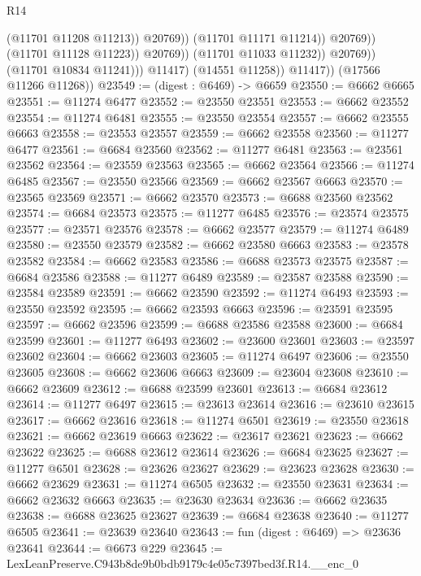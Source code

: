 \begin{lexlean}{R14}
\begin{coremodule}
                                          (@11701 @11208 @11213))
                                        @20769))
                                    (@11701 @11171 @11214))
                                  @20769))
                              (@11701 @11128 @11223))
                            @20769))
                        (@11701 @11033 @11232))
                      @20769))
                  (@11701 @10834 @11241)))
              @11417)
            (@14551 @11258))
          @11417))
      (@17566 @11266 @11268))
@23549 := (digest : @6469) -> @6659
@23550 := @6662 @6665
@23551 := @11274 @6477
@23552 := @23550 @23551
@23553 := @6662 @23552
@23554 := @11274 @6481
@23555 := @23550 @23554
@23557 := @6662 @23555 @6663
@23558 := @23553 @23557
@23559 := @6662 @23558
@23560 := @11277 @6477
@23561 := @6684 @23560
@23562 := @11277 @6481
@23563 := @23561 @23562
@23564 := @23559 @23563
@23565 := @6662 @23564
@23566 := @11274 @6485
@23567 := @23550 @23566
@23569 := @6662 @23567 @6663
@23570 := @23565 @23569
@23571 := @6662 @23570
@23573 := @6688 @23560 @23562
@23574 := @6684 @23573
@23575 := @11277 @6485
@23576 := @23574 @23575
@23577 := @23571 @23576
@23578 := @6662 @23577
@23579 := @11274 @6489
@23580 := @23550 @23579
@23582 := @6662 @23580 @6663
@23583 := @23578 @23582
@23584 := @6662 @23583
@23586 := @6688 @23573 @23575
@23587 := @6684 @23586
@23588 := @11277 @6489
@23589 := @23587 @23588
@23590 := @23584 @23589
@23591 := @6662 @23590
@23592 := @11274 @6493
@23593 := @23550 @23592
@23595 := @6662 @23593 @6663
@23596 := @23591 @23595
@23597 := @6662 @23596
@23599 := @6688 @23586 @23588
@23600 := @6684 @23599
@23601 := @11277 @6493
@23602 := @23600 @23601
@23603 := @23597 @23602
@23604 := @6662 @23603
@23605 := @11274 @6497
@23606 := @23550 @23605
@23608 := @6662 @23606 @6663
@23609 := @23604 @23608
@23610 := @6662 @23609
@23612 := @6688 @23599 @23601
@23613 := @6684 @23612
@23614 := @11277 @6497
@23615 := @23613 @23614
@23616 := @23610 @23615
@23617 := @6662 @23616
@23618 := @11274 @6501
@23619 := @23550 @23618
@23621 := @6662 @23619 @6663
@23622 := @23617 @23621
@23623 := @6662 @23622
@23625 := @6688 @23612 @23614
@23626 := @6684 @23625
@23627 := @11277 @6501
@23628 := @23626 @23627
@23629 := @23623 @23628
@23630 := @6662 @23629
@23631 := @11274 @6505
@23632 := @23550 @23631
@23634 := @6662 @23632 @6663
@23635 := @23630 @23634
@23636 := @6662 @23635
@23638 := @6688 @23625 @23627
@23639 := @6684 @23638
@23640 := @11277 @6505
@23641 := @23639 @23640
@23643 := fun (digest : @6469) => @23636 @23641
@23644 := @6673 @229
@23645 := LexLeanPreserve.C943b8de9b0bdb9179c4e05c7397bed3f.R14.__enc_0

\end{coremodule}
\end{lexlean}
